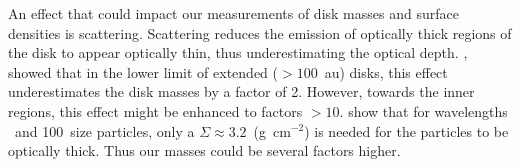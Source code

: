 An effect that could impact our measurements of disk masses and surface densities is scattering. Scattering reduces the emission of optically thick regions of the disk to appear optically thin, thus underestimating the optical depth. \citet{2019ApJ...877L..18Z}, showed that in the lower limit of extended ($>100$~au) disks, this effect underestimates the disk masses by a factor of 2. However, towards the inner regions, this effect might be enhanced to factors $>10$. \citet{2020ApJ...892..136S} show that for wavelengths ~\micron\space and 100~\micron \space size particles, only a $\Sigma\approx3.2$~(g~cm$^{-2}$) is needed for the particles to be optically thick. Thus our masses could be several factors higher.




